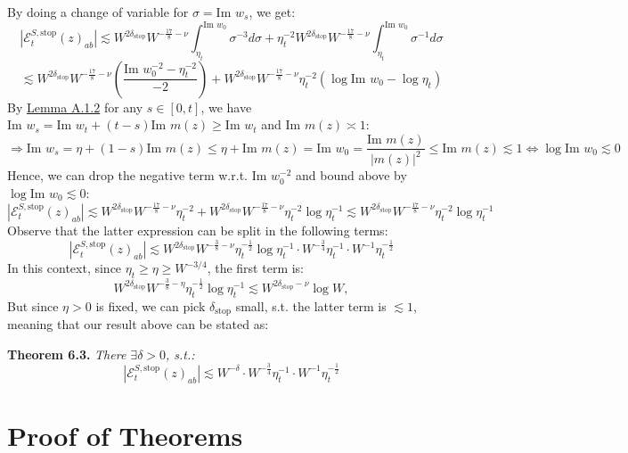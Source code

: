 \documentclass[11pt]{article}
\newenvironment{boxtheorem}[1]
  {\begin{mdframed}\noindent\textbf{#1}\itshape\space}
  {\end{mdframed}}
\newcommand{\E}{\mathcal{E}}
\newcommand{\sto}{\text{stop}}
\newcommand{\im}{\text{Im }}
\begin{document}
By doing a change of variable for $\sigma = \im w_s$, we get: 
\begin{equation*}
|\E_t^{S, \sto}(z)_{ab}|\lesssim W^{2\delta_\sto} W^{-\frac{17}{8}-\nu}\int_{\eta_t}^{\im w_0}\sigma^{-3}d\sigma + \eta_t^{-2} W^{2\delta_\sto} W^{-\frac{17}{8}-\nu}\int_{\eta_t}^{\im w_0}\sigma^{-1}d\sigma
\end{equation*}
\begin{equation*}
\lesssim W^{2\delta_\sto} W^{-\frac{17}{8}-\nu} \left(\frac{\im w_0^{-2}-\eta_t^{-2}}{-2}\right)+W^{2\delta_\sto}W^{-\frac{17}{8}-\nu}\eta_t^{-2}\left(\log \im w_0-\log \eta_t\right)
\end{equation*}
By \hyperref[lemma-a12]{Lemma A.1.2} for any $s\in [0, t]$, we have $\im w_s = \im w_t+(t-s)\im m(z)\geq \im w_t$
and \hyperref[2.1]{$\im m(z)\asymp 1$}:
$$\Rightarrow \im w_s = \eta+(1-s)\im m(z)\leq \eta+ \im m(z) = \im w_0 = \frac{\im m(z)}{|m(z)|^2}\leq \im m(z)\lesssim 1\Leftrightarrow \log \im w_0\lesssim 0$$
Hence, we can drop the negative term w.r.t. $\im w_0^{-2}$ and bound above by $\log \im w_0\lesssim 0$:
\begin{equation*}
|\E_t^{S, \sto}(z)_{ab}|\lesssim W^{2\delta_\sto} W^{-\frac{17}{8}-\nu} \eta_t^{-2}+W^{2\delta_\sto}W^{-\frac{17}{8}-\nu}\eta_t^{-2}\log \eta_t^{-1} \lesssim W^{2\delta_\sto}W^{-\frac{17}{8}-\nu}\eta_t^{-2}\log \eta_t^{-1}
\end{equation*}
Observe that the latter expression can be split in the following terms: $$|\E_t^{S, \sto}(z)_{ab}|\lesssim W^{2\delta_\sto} W^{-\frac{3}{8}-\nu} \eta_t^{-\frac{1}{2}}\log \eta_t^{-1}\cdot W^{-\frac{3}{4}}\eta_t^{-1}\cdot W^{-1}\eta_t^{-\frac{1}{2}}$$
In this context, since $\eta_t \geq \eta\geq W^{-3/4}$, the first term is: $$W^{2\delta_\sto} W^{-\frac{3}{8}-\eta}\eta_t^{-\frac{1}{2}}\log \eta_t^{-1}\lesssim W^{2\delta_\sto-\nu}\log W,$$
But since $\eta>0$ is fixed, we can pick $\delta_\sto$ small, s.t. the latter term is $\lesssim 1$, meaning that our result above can be stated as: 
\begin{boxtheorem}{Theorem 6.3. }There $\exists \delta>0$, s.t.:
$$|\E_t^{S, \sto}(z)_{ab}|\lesssim W^{-\delta}\cdot W^{-\frac{3}{4}}\eta_t^{-1}\cdot W^{-1}\eta_t^{-\frac{1}{2}}$$
\end{boxtheorem}

\newpage

\section{Proof of Theorems}
\end{document}
